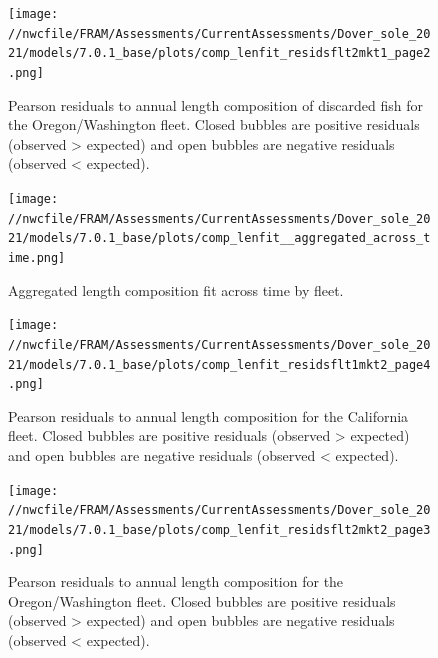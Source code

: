 \documentclass[11pt,
  english,
  a4paper,
]{article}
\begin{document}
\begin{figure}
\centering
\texttt{[image: //nwcfile/FRAM/Assessments/CurrentAssessments/Dover\_sole\_2021/models/7.0.1\_base/plots/comp\_lenfit\_residsflt2mkt1\_page2.png]}
\caption{Pearson residuals to annual length composition of discarded fish for the Oregon/Washington fleet. Closed bubbles are positive residuals (observed \textgreater{} expected) and open bubbles are negative residuals (observed \textless{} expected).\label{fig:orwa-disc-pearson}}
\end{figure}

\tagmcend\tagstructend


\begin{figure}
\centering
\texttt{[image: //nwcfile/FRAM/Assessments/CurrentAssessments/Dover\_sole\_2021/models/7.0.1\_base/plots/comp\_lenfit\_\_aggregated\_across\_time.png]}
\caption{Aggregated length composition fit across time by fleet.\label{fig:agg-fits}}
\end{figure}

\tagmcend\tagstructend


\begin{figure}
\centering
\texttt{[image: //nwcfile/FRAM/Assessments/CurrentAssessments/Dover\_sole\_2021/models/7.0.1\_base/plots/comp\_lenfit\_residsflt1mkt2\_page4.png]}
\caption{Pearson residuals to annual length composition for the California fleet. Closed bubbles are positive residuals (observed \textgreater{} expected) and open bubbles are negative residuals (observed \textless{} expected).\label{fig:ca-pearson}}
\end{figure}

\tagmcend\tagstructend


\begin{figure}
\centering
\texttt{[image: //nwcfile/FRAM/Assessments/CurrentAssessments/Dover\_sole\_2021/models/7.0.1\_base/plots/comp\_lenfit\_residsflt2mkt2\_page3.png]}
\caption{Pearson residuals to annual length composition for the Oregon/Washington fleet. Closed bubbles are positive residuals (observed \textgreater{} expected) and open bubbles are negative residuals (observed \textless{} expected).\label{fig:orwa-pearson}}
\end{figure}
\end{document}
